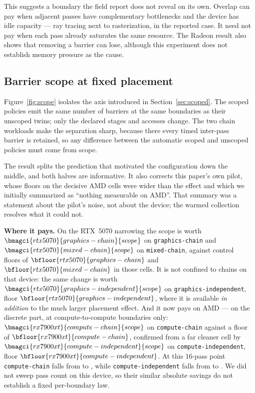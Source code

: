 \documentclass[10pt,twocolumn]{article}
\begin{document}
This suggests a boundary the field report does not reveal on its own. Overlap
can pay when adjacent passes have complementary bottlenecks and the device has
idle capacity --- ray tracing next to rasterization, in the reported case. It
need not pay when each pass already saturates the same resource. The Radeon
result also shows that removing a barrier can lose, although this experiment
does not establish memory pressure as the cause.

\subsection{Barrier scope at fixed placement}
\label{sec:scope-results}




Figure~\ref{fig:scope} isolates the axis introduced in
Section~\ref{sec:scoped}. The scoped policies emit the same number of barriers
at the same boundaries as their unscoped twins; only the declared stages and
accesses change. The two chain workloads make the separation sharp, because
there every timed inter-pass barrier is retained, so any difference between
the automatic scoped and unscoped policies must come from scope.

The result splits the prediction that motivated the configuration down the
middle, and both halves are informative. It also corrects this paper's own
pilot, whose floors on the decisive AMD cells were wider than the effect and
which we initially summarized as ``nothing measurable on AMD''. That summary
was a statement about the pilot's noise, not about the device; the warmed
collection resolves what it could not.

\textbf{Where it pays.} On the RTX~5070 narrowing the scope is worth
$\bmagci{rtx5070}{graphics-chain}{scope}$ on \texttt{graphics-chain} and
$\bmagci{rtx5070}{mixed-chain}{scope}$ on \texttt{mixed-chain}, against control
floors of $\bfloor{rtx5070}{graphics-chain}$ and $\bfloor{rtx5070}{mixed-chain}$
in those cells. It is not confined to chains on that device: the same change is
worth $\bmagci{rtx5070}{graphics-independent}{scope}$ on
\texttt{graphics-independent}, floor $\bfloor{rtx5070}{graphics-independent}$,
where it is available \emph{in addition} to the much larger placement effect.
And it now pays on AMD --- on the discrete part, at compute-to-compute
boundaries only: $\bmagci{rx7900xt}{compute-chain}{scope}$ on
\texttt{compute-chain} against a floor of $\bfloor{rx7900xt}{compute-chain}$,
confirmed from a far cleaner cell by
$\bmagci{rx7900xt}{compute-independent}{scope}$ on
\texttt{compute-independent}, floor $\bfloor{rx7900xt}{compute-independent}$.
At this 16-pass point \texttt{compute-chain} falls from
 to
, while
\texttt{compute-independent} falls from
 to
. We did not sweep pass count on
this device, so their similar absolute savings do not establish a fixed
per-boundary law.
\end{document}
